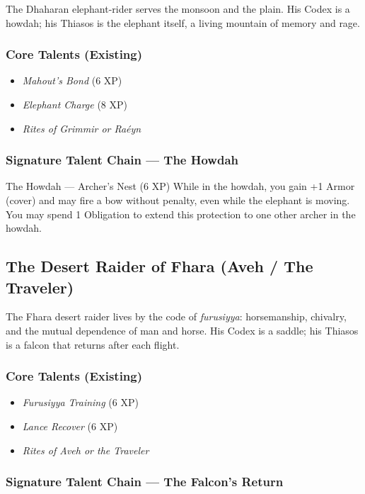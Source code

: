 \documentclass[9pt,a5paper]{extbook}
\begin{document}
The Dhaharan elephant-rider serves the monsoon and the plain. His Codex is a howdah; his Thiasos is the elephant itself, a living mountain of memory and rage.

\subsubsection{Core Talents (Existing)}
\begin{itemize}
    \item \textit{Mahout's Bond} (6 XP)
    \item \textit{Elephant Charge} (8 XP)
    \item \textit{Rites of Grimmir or Raéyn}
\end{itemize}

\subsubsection{Signature Talent Chain --- The Howdah}

\begin{talentbox}{The Howdah --- Archer's Nest (6 XP)}
While in the howdah, you gain +1 Armor (cover) and may fire a bow without penalty, even while the elephant is moving. You may spend 1 Obligation to extend this protection to one other archer in the howdah.
\end{talentbox}

\subsection{The Desert Raider of Fhara (Aveh / The Traveler)}

The Fhara desert raider lives by the code of \textit{furusiyya}: horsemanship, chivalry, and the mutual dependence of man and horse. His Codex is a saddle; his Thiasos is a falcon that returns after each flight.

\subsubsection{Core Talents (Existing)}
\begin{itemize}
    \item \textit{Furusiyya Training} (6 XP)
    \item \textit{Lance Recover} (6 XP)
    \item \textit{Rites of Aveh or the Traveler}
\end{itemize}

\subsubsection{Signature Talent Chain --- The Falcon's Return}
\end{document}
